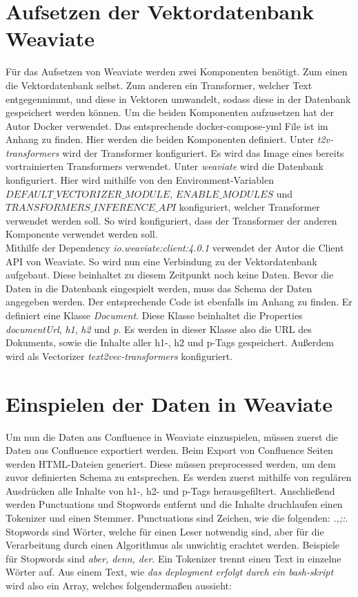 \section{Aufsetzen der Vektordatenbank Weaviate}
Für das Aufsetzen von Weaviate werden zwei Komponenten benötigt.
Zum einen die Vektordatenbank selbst.
Zum anderen ein Transformer, welcher Text entgegennimmt, und diese in Vektoren umwandelt, sodass diese in der Datenbank gespeichert werden können.
Um die beiden Komponenten aufzusetzen hat der Autor Docker verwendet.
Das entsprechende docker-compose-yml File ist im Anhang zu finden.
Hier werden die beiden Komponenten definiert.
Unter \textit{t2v-transformers} wird der Transformer konfiguriert.
Es wird das Image eines bereits vortrainierten Transformers verwendet.
Unter \textit{weaviate} wird die Datenbank konfiguriert.
Hier wird mithilfe von den Environment-Variablen \textit{$DEFAULT\_VECTORIZER\_MODULE$}, \textit{$ENABLE\_MODULES$} und \textit{$TRANSFORMERS\_INFERENCE\_API$} konfiguriert, welcher Transformer verwendet werden soll.
So wird konfiguriert, dass der Transformer der anderen Komponente verwendet werden soll.\\

Mithilfe der Dependency \textit{io.weaviate:client:4.0.1} verwendet der Autor die Client API von Weaviate.
So wird nun eine Verbindung zu der Vektordatenbank aufgebaut.
Diese beinhaltet zu diesem Zeitpunkt noch keine Daten.
Bevor die Daten in die Datenbank eingespielt werden, muss das Schema der Daten angegeben werden.
Der entsprechende Code ist ebenfalls im Anhang zu finden.
Er definiert eine Klasse \textit{Document}.
Diese Klasse beinhaltet die Properties \textit{documentUrl}, \textit{h1}, \textit{h2} und \textit{p}.
Es werden in dieser Klasse also die URL des Dokuments, sowie die Inhalte aller h1-, h2 und p-Tags gespeichert.
Außerdem wird als Vectorizer \textit{text2vec-transformers} konfiguriert.\\

\section{Einspielen der Daten in Weaviate}
Um nun die Daten aus Confluence in Weaviate einzuspielen, müssen zuerst die Daten aus Confluence exportiert werden.
Beim Export von Confluence Seiten werden HTML-Dateien generiert.
Diese müssen preprocessed werden, um dem zuvor definierten Schema zu entsprechen.
Es werden zuerst mithilfe von regulären Ausdrücken alle Inhalte von h1-, h2- und p-Tags herausgefiltert.
Anschließend werden Punctuations und Stopwords entfernt und die Inhalte druchlaufen einen Tokenizer und einen Stemmer.
Punctuations sind Zeichen, wie die folgenden: \textit{.,;:}.
Stopwords sind Wörter, welche für einen Leser notwendig sind, aber für die Verarbeitung durch einen Algorithmus als unwichtig erachtet werden.
Beispiele für Stopwords sind \textit{aber, denn, der}.
Ein Tokenizer trennt einen Text in einzelne Wörter auf.
Aus einem Text, wie \textit{das deployment erfolgt durch ein bash-skript} wird also ein Array, welches folgendermaßen aussieht:\\

